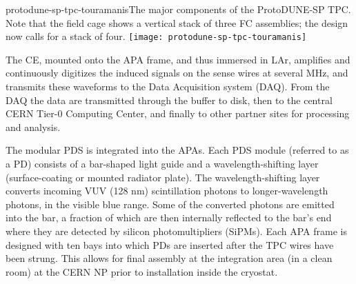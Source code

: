 \begin{cdrfigure}{protodune-sp-tpc-touramanis}{The major components of the ProtoDUNE-SP TPC. Note that the field cage shows a vertical stack of three FC assemblies; the design now calls for a stack of four.}
\texttt{[image: protodune-sp-tpc-touramanis]}
\end{cdrfigure}

The CE, mounted onto the APA frame, and thus immersed in LAr, amplifies and continuously digitizes the induced signals on the sense wires at several MHz, and transmits these waveforms to the Data Acquisition system (DAQ). From the DAQ the data are  transmitted through the buffer to disk, then to the central CERN Tier-0 Computing Center, and finally to other partner sites for processing and analysis.  

The modular PDS is integrated into the APAs. Each PDS module (referred to as a PD) consists of a bar-shaped light guide and
a wavelength-shifting layer (surface-coating or mounted radiator plate). The wavelength-shifting layer converts incoming VUV (128 nm) 
scintillation photons to longer-wavelength photons, in the visible blue range. Some of the converted photons are emitted into the bar, a fraction of which are then internally reflected to the bar's end where they are detected by silicon photomultipliers (SiPMs).
Each APA frame is designed with ten bays into which PDs are inserted after the TPC wires have been strung. This  allows for final assembly at the integration area (in a clean room) at the CERN NP prior to installation inside the cryostat. 



